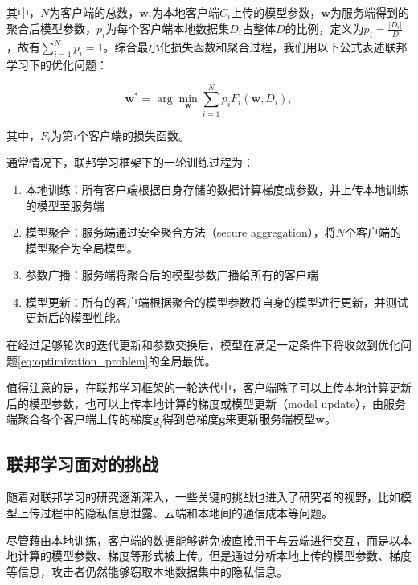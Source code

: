 其中，$N$为客户端的总数，$\mathbf{w}_i$为本地客户端$C_i$上传的模型参数，$\mathbf{w}$为服务端得到的聚合后模型参数，$p_i$为每个客户端本地数据集$D_i$占整体$D$的比例，定义为$p_i=\frac{|D_i|}{|D|}$，故有$\sum_{i = 1}^Np_i = 1$。综合最小化损失函数和聚合过程，我们用以下公式表述联邦学习下的优化问题：

\begin{equation}
  \mathbf{w}^* = \arg\min_{\mathbf{w}}\sum_{i = 1}^{N}p_iF_i(\mathbf{w}, D_i),
  \label{eq:optimization_problem}
\end{equation}

其中，$F_i$为第$i$个客户端的损失函数。

通常情况下，联邦学习框架下的一轮训练过程为：

\begin{enumerate}
  \item 本地训练：所有客户端根据自身存储的数据计算梯度或参数，并上传本地训练的模型至服务端
  \item 模型聚合：服务端通过安全聚合方法（secure aggregation），将$N$个客户端的模型聚合为全局模型。
  \item 参数广播：服务端将聚合后的模型参数广播给所有的客户端
  \item 模型更新：所有的客户端根据聚合的模型参数将自身的模型进行更新，并测试更新后的模型性能。
\end{enumerate}

在经过足够轮次的迭代更新和参数交换后，模型在满足一定条件下将收敛到优化问题\ref{eq:optimization_problem}的全局最优\cite{li2020federated}。

值得注意的是，在联邦学习框架的一轮迭代中，客户端除了可以上传本地计算更新后的模型参数，也可以上传本地计算的梯度或模型更新（model update），由服务端聚合各个客户端上传的梯度$\mathbf{g}_i$得到总梯度$\mathbf{g}$来更新服务端模型$\mathbf{w}$\cite{wei2020federated}。

\subsection{联邦学习面对的挑战}

随着对联邦学习的研究逐渐深入，一些关键的挑战也进入了研究者的视野，比如模型上传过程中的隐私信息泄露、云端和本地间的通信成本等问题\cite{kairouz2021advances}。

尽管藉由本地训练，客户端的数据能够避免被直接用于与云端进行交互，而是以本地计算的模型参数、梯度等形式被上传。但是通过分析本地上传的模型参数、梯度等信息，攻击者仍然能够窃取本地数据集中的隐私信息\cite{li2020federated, wei2020federated}。

